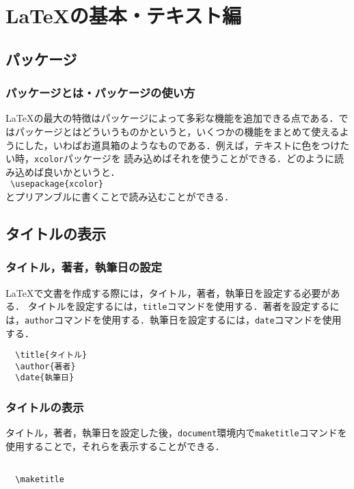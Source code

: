 \section{\LaTeX の基本・テキスト編}
\subsection{パッケージ}
\subsubsection{パッケージとは・パッケージの使い方}
\LaTeX の最大の特徴はパッケージによって多彩な機能を追加できる点である．ではパッケージとはどういうものかというと，いくつかの機能をまとめて使えるようにした，いわばお道具箱のようなものである．例えば，テキストに色をつけたい時，\texttt{xcolor}パッケージを
読み込めばそれを使うことができる．どのように読み込めば良いかというと．\\
\texttt{
\indent
\textbackslash usepackage\{xcolor\}
}\\
とプリアンブルに書くことで読み込むことができる．
\subsection{タイトルの表示}
\subsubsection{タイトル，著者，執筆日の設定}
\LaTeX で文書を作成する際には，タイトル，著者，執筆日を設定する必要がある．
タイトルを設定するには，\texttt{title}コマンドを使用する．著者を設定するには，\texttt{author}コマンドを使用する．執筆日を設定するには，\texttt{date}コマンドを使用する．
\begin{lstlisting}
  \title{タイトル}
  \author{著者}
  \date{執筆日}
\end{lstlisting}
\subsubsection{タイトルの表示}
タイトル，著者，執筆日を設定した後，\texttt{document}環境内で\texttt{maketitle}コマンドを使用することで，それらを表示することができる．
\begin{lstlisting}

  \maketitle

\end{lstlisting}
\newpage
